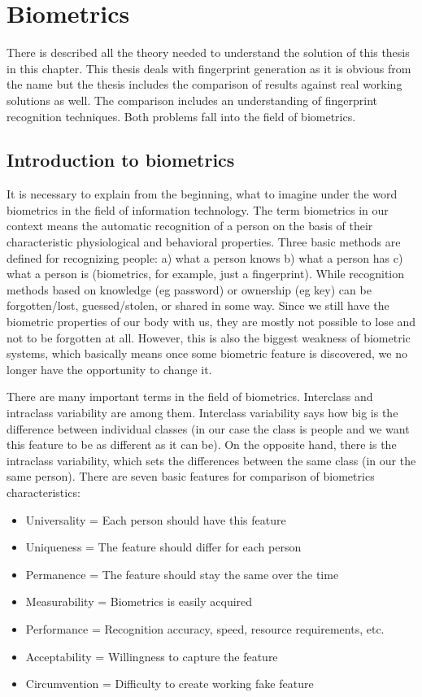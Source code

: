 \chapter{Biometrics} \label{theory}
There is described all the theory needed to understand the solution of this thesis in this chapter. This thesis deals with fingerprint generation as it is obvious from the name but the thesis includes the comparison of results against real working solutions as well. The comparison includes an understanding of fingerprint recognition techniques. Both problems fall into the field of biometrics. 

\section{Introduction to biometrics}
It is necessary to explain from the beginning, what to imagine under the word biometrics in the field of information technology. The term biometrics in our context means the automatic recognition of a person on the basis of their characteristic physiological and behavioral properties. Three basic methods are defined for recognizing people: a) what a person knows b) what a person has c) what a person is (biometrics, for example, just a fingerprint). While recognition methods based on knowledge (eg password) or ownership (eg key) can be forgotten/lost, guessed/stolen, or shared in some way. \cite{jain2011introduction} Since we still have the biometric properties of our body with us, they are mostly not possible to lose and not to be forgotten at all. However, this is also the biggest weakness of biometric systems, which basically means once some biometric feature is discovered, we no longer have the opportunity to change it.\cite{maltoni2009handbook}

There are many important terms in the field of biometrics. Interclass and intraclass variability are among them. Interclass variability says how big is the difference between individual classes (in our case the class is people and we want this feature to be as different as it can be). On the opposite hand, there is the intraclass variability, which sets the differences between the same class (in our the same person). There are seven basic features for comparison of biometrics characteristics\cite{maltoni2009handbook}:

\begin{itemize}
    \setlength\itemsep{0.2em}
    \item Universality = Each person should have this feature
    \item Uniqueness = The feature should differ for each person
    \item Permanence = The feature should stay the same over the time 
    \item Measurability = Biometrics is easily acquired
    \item Performance = Recognition accuracy, speed, resource requirements, etc.
    \item Acceptability = Willingness to capture the feature 
    \item Circumvention = Difficulty to create working fake feature \cite{maltoni2009handbook} \cite{jain2007handbook} \cite{01BioPrednaska}
\end{itemize}

